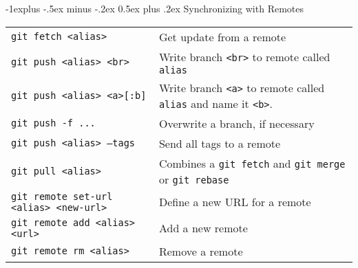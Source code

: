 \documentclass[a4paper,10pt,landscape]{article}
\makeatletter
\renewcommand{\subsection}{\@startsection{subsection}{2}{0mm}%
                                {-1explus -.5ex minus -.2ex}%
                                {0.5ex plus .2ex}%
                                {\normalfont\normalsize\bfseries}}
\makeatother
\begin{document}
\begin{multicols}{3}
\subsection{Synchronizing with Remotes}
\begin{mdframed}[style=mystyle]
\begin{tabular}{@{}p{\the\MyLen}%
                @{}p{\linewidth-\the\MyLen}@{}}
\texttt{git fetch <alias>}        & Get update from a remote \\
\texttt{git push <alias> <br> }    & Write branch \texttt{<br>} to remote called \texttt{alias} \\
\texttt{git push <alias> <a>[:b]} & Write branch \texttt{<a>} to remote called \texttt{alias} and name it \texttt{<b>}. \\
\texttt{git push  -f ...}          & Overwrite a branch, if necessary \\
\texttt{git push <alias> --tags}    & Send all tags to a remote\\
\texttt{git pull <alias>}         & Combines a \texttt{git fetch} and \texttt{git merge} or \texttt{git rebase} \\
\texttt{git remote set-url <alias> <new-url>}  & Define a new URL for a remote \\
\texttt{git remote add <alias> <url>} & Add a new remote \\
\texttt{git remote rm <alias>} & Remove a remote \\
\end{tabular}
\end{mdframed}


%

\end{multicols}
\end{document}

